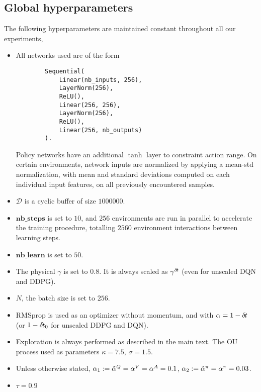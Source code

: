 \subsection{Global hyperparameters}
The following hyperparameters are maintained constant throughout all our experiments,
\begin{itemize}
	\item All networks used are of the form
		\begin{verbatim}
		Sequential(
		    Linear(nb_inputs, 256),
		    LayerNorm(256),
		    ReLU(),
		    Linear(256, 256),
		    LayerNorm(256),
		    ReLU(),
		    Linear(256, nb_outputs)
		).
		\end{verbatim}
	Policy networks have an additional $\tanh$ layer to constraint action range. On certain
	environments, network inputs are normalized by applying a mean-std normalization, with
	mean and standard deviations computed on each individual input features, on all previously
	encountered samples.
	\item $\mathcal{D}$ is a cyclic buffer of size $1000000$.
	\item $\textbf{nb\_steps}$ is set to $10$, and $256$ environments are run in parallel to
		accelerate the training procedure, totalling $2560$ environment interactions between
		learning steps.
	\item $\textbf{nb\_learn}$ is set to $50$.
	\item The physical $\gamma$ is set to $0.8$. It is always scaled as $\gamma^{\delta\hspace{-.1em}t}$ (even for
		unscaled DQN and DDPG).
	\item $N$, the batch size is set to $256$.
	\item RMSprop is used as an optimizer without momentum, and with
		$\alpha=1 - {\delta\hspace{-.1em}t}$ (or $1 - {\delta\hspace{-.1em}t}_0$ for unscaled DDPG and
		DQN).
	\item Exploration is always performed as described in the main text. The OU process used as
		parameters $\kappa = 7.5$, $\sigma = 1.5$.
	\item Unless otherwise stated, $\alpha_1 \mathrel{\mathop{:}}= \tilde{\alpha}^Q = \alpha^V = \alpha^A = 0.1$, $\alpha_2 \mathrel{\mathop{:}}= \tilde{\alpha}^\pi =
		\alpha^\pi = 0.03$.
	\item $\tau = 0.9$
\end{itemize}
